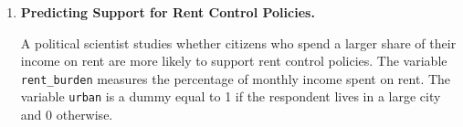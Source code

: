 \documentclass[12pt]{article}
\newif\ifsolutions
\begin{document}
\begin{enumerate}

    \item \textbf{Predicting Support for Rent Control Policies.}
    
    A political scientist studies whether citizens who spend a larger share of their income on rent are more likely to support rent control policies. The variable \texttt{rent\_burden} measures the percentage of monthly income spent on rent. The variable \texttt{urban} is a dummy equal to 1 if the respondent lives in a large city and 0 otherwise.
    

\end{enumerate}
\end{document}

